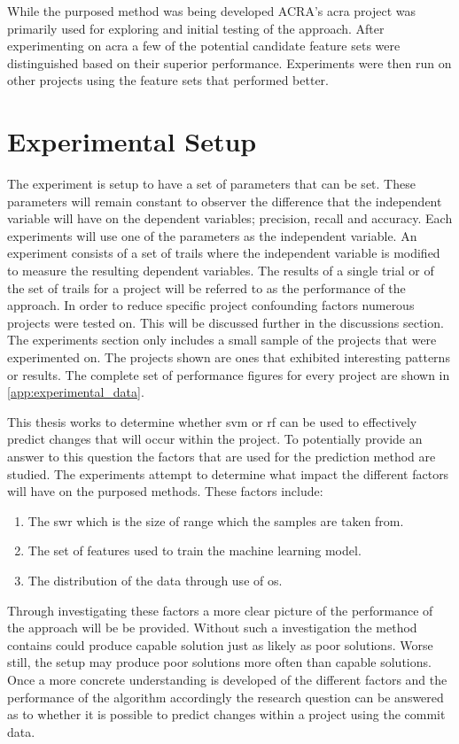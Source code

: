 While the purposed method was being developed ACRA's acra project was primarily used for exploring and initial testing of the approach. After experimenting on acra a few of the potential candidate feature sets were distinguished based on their superior performance. Experiments were then run on other projects using the feature sets that performed better.

\section{Experimental Setup}


The experiment is setup to have a set of parameters that can be set. These parameters will remain constant to observer the difference that the independent variable will have on the dependent variables; precision, recall and accuracy. Each experiments will use one of the parameters as the independent variable. An experiment consists of a set of trails where the independent variable is modified to measure the resulting dependent variables. The results of a single trial or of the set of trails for a project will be referred to as the performance of the approach. In order to reduce specific project confounding factors numerous projects were tested on. This will be discussed further in the discussions section. The experiments section only includes a small sample of the projects that were experimented on. The projects shown are ones that exhibited interesting patterns or results. The complete set of performance figures for every project are shown in \autoref{app:experimental_data}.

This thesis works to determine whether \gls{svm} or \gls{rf} can be used to effectively predict changes that will occur within the project. To potentially provide an answer to this question the factors that are used for the prediction method are studied. The experiments attempt to determine what impact the different factors will have on the purposed methods. These factors include:
\begin{enumerate}
\item The \gls{swr} which is the size of range which the samples are taken from.
\item The set of features used to train the machine learning model.
\item The distribution of the data through use of \gls{os}.
\end{enumerate}

Through investigating these factors a more clear picture of the performance of the approach will be be provided. Without such a investigation the method contains could produce capable solution just as likely as poor solutions. Worse still, the setup may produce poor solutions more often than capable solutions. Once a more concrete understanding is developed of the different factors and the performance of the algorithm accordingly the research question can be answered as to whether it is possible to predict changes within a project using the commit data.

